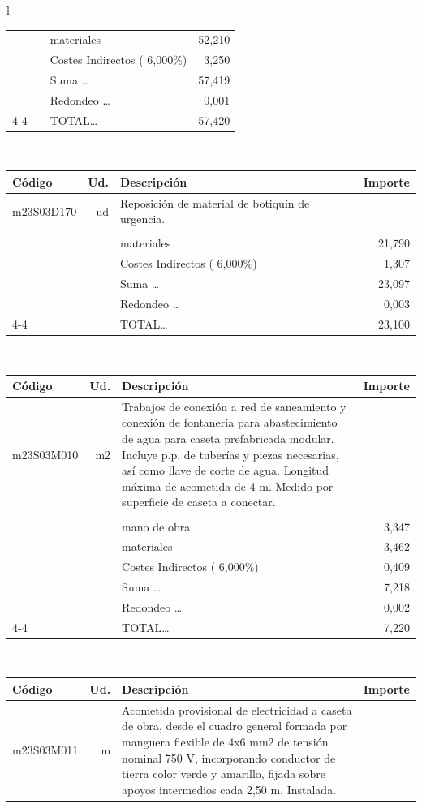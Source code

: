 \documentclass{book}%
\begin{document}
\begin{longtable}{l}
\begin{tabular}{l r p{60mm} r}
&&materiales&    52,210\\%
&&Costes Indirectos (     6,000\%)&     3,250\\%
&&Suma \ldots&    57,419\\%
&&Redondeo \ldots&     0,001\\%
\cline{4-4}%
&&TOTAL\ldots&    57,420\\%
\end{tabular}\\%
\begin{tabular}{l r p{60mm} r}%
Código&Ud.&Descripción&Importe\\%
\hline%
m23S03D170&ud&Reposición de material de botiquín de urgencia.&\\%
&&&\\%
&&materiales&    21,790\\%
&&Costes Indirectos (     6,000\%)&     1,307\\%
&&Suma \ldots&    23,097\\%
&&Redondeo \ldots&     0,003\\%
\cline{4-4}%
&&TOTAL\ldots&    23,100\\%
\end{tabular}\\%
\begin{tabular}{l r p{60mm} r}%
Código&Ud.&Descripción&Importe\\%
\hline%
m23S03M010&m2&Trabajos de conexión a red de saneamiento y conexión de fontanería para abastecimiento de agua para caseta prefabricada modular. Incluye p.p. de tuberías y piezas necesarias, así como llave de corte de agua. Longitud máxima de acometida de 4 m. Medido por superficie de caseta a conectar.&\\%
&&&\\%
&&mano de obra&     3,347\\%
&&materiales&     3,462\\%
&&Costes Indirectos (     6,000\%)&     0,409\\%
&&Suma \ldots&     7,218\\%
&&Redondeo \ldots&     0,002\\%
\cline{4-4}%
&&TOTAL\ldots&     7,220\\%
\end{tabular}\\%
\begin{tabular}{l r p{60mm} r}%
Código&Ud.&Descripción&Importe\\%
\hline%
m23S03M011&m&Acometida provisional de electricidad a caseta de obra, desde el cuadro general formada por manguera flexible de 4x6 mm2 de tensión nominal 750 V, incorporando conductor de tierra color verde y amarillo, fijada sobre apoyos intermedios cada 2,50 m. Instalada.&\\%

\end{tabular}
\end{longtable}
\end{document}
